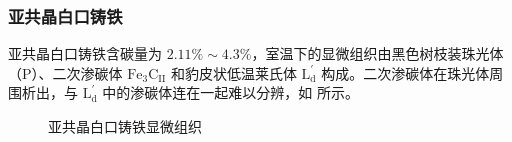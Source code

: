 \documentclass[a4paper,utf8]{article}
\begin{document}
    \subsubsection{亚共晶白口铸铁}
    亚共晶白口铸铁含碳量为 $2.11\%\sim 4.3\%$，室温下的显微组织由黑色树枝装珠光体（P）、二次渗碳体 $\text{Fe}_3\text{C}_\text{II}$ 和豹皮状低温莱氏体 $\text{L}_\text{d}^{'}$ 构成。二次渗碳体在珠光体周围析出，与 $\text{L}_\text{d}^{'}$ 中的渗碳体连在一起难以分辨，如 所示。
    \begin{figure}[!ht]
        \hspace{20pt}
        \hspace{20pt}
        \caption{亚共晶白口铸铁显微组织\label{fig:n5}}
    \end{figure}
\end{document}
